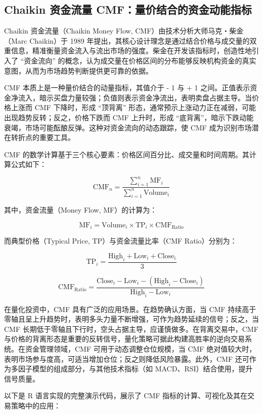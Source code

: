 \documentclass[]{ctexbook}
\begin{document}
\subsection{Chaikin 资金流量 CMF：量价结合的资金动能指标}\label{chaikin-ux8d44ux91d1ux6d41ux91cf-cmfux91cfux4ef7ux7ed3ux5408ux7684ux8d44ux91d1ux52a8ux80fdux6307ux6807}

Chaikin 资金流量（Chaikin Money Flow, CMF）由技术分析大师马克・柴金（Marc Chaikin）于 1989 年提出，其核心设计理念是通过结合价格与成交量的双重信息，精准衡量资金流入与流出市场的强度。柴金在开发该指标时，创造性地引入了 ``资金流向'' 的概念，认为成交量在价格区间的分布能够反映机构资金的真实意图，从而为市场趋势判断提供更可靠的依据。

CMF 本质上是一种量价结合的动量指标，其值介于 - 1 与 + 1 之间。正值表示资金净流入，暗示买盘力量较强；负值则表示资金净流出，表明卖盘占据主导。当价格上涨而 CMF 下降时，形成 ``顶背离'' 形态，通常预示上涨动力正在减弱，可能出现趋势反转；反之，价格下跌而 CMF 上升时，形成 ``底背离''，暗示下跌动能衰竭，市场可能酝酿反弹。这种对资金流向的动态跟踪，使 CMF 成为识别市场潜在转折点的重要工具。

CMF 的数学计算基于三个核心要素：价格区间百分比、成交量和时间周期。其计算公式如下：

\[
\text{CMF}_n = \frac{\sum_{i=1}^{n}\text{MF}_i}{\sum_{i=1}^{n}\text{Volume}_i}
\]

其中，资金流量（Money Flow, MF）的计算为：

\[\text{MF}_i = \text{Volume}_{i}\times \text{TP}_i \times \text{CMF}_\text{Ratio}\]

而典型价格（Typical Price, TP）与资金流量比率（CMF Ratio）分别为：

\[\text{TP}_i = \frac{\text{High}_i + \text{Low}_i + \text{Close}_i}{3}\]

\[\text{CMF}_\text{Ratio} = \frac{\text{Close}_i - \text{Low}_i - (\text{High}_i - \text{Close}_i)}{\text{High}_i - \text{Low}_i}
\]

在量化投资中，CMF 具有广泛的应用场景。在趋势确认方面，当 CMF 持续高于零轴且呈上升趋势时，表明多头力量不断增强，可作为趋势延续的信号；反之，当 CMF 长期低于零轴且下行时，空头占据主导，应谨慎做多。在背离交易中，CMF 与价格的背离形态是重要的反转信号，量化策略可据此构建高胜率的逆向交易系统。在资金管理领域，CMF 可用于动态调整仓位规模，当 CMF 绝对值较大时，表明市场参与度高，可适当增加仓位；反之则降低风险暴露。此外，CMF 还可作为多因子模型的组成部分，与其他技术指标（如 MACD、RSI）结合使用，提升信号质量。

以下是 R 语言实现的完整演示代码，展示了 CMF 指标的计算、可视化及其在交易策略中的应用：
\end{document}
